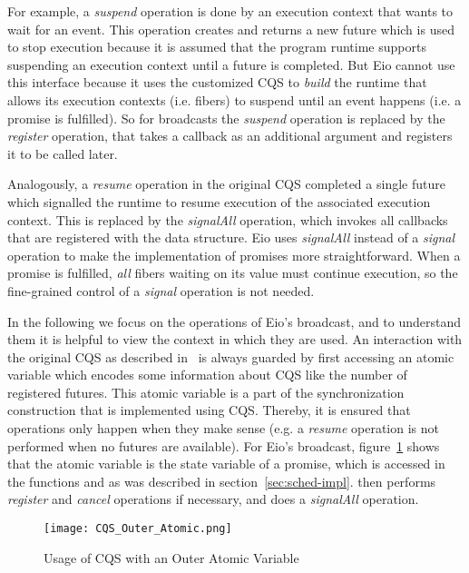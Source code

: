 For example, a \emph{suspend} operation is done by an execution context that wants to wait for an event.
This operation creates and returns a new future which is used to stop execution because it is assumed that the program runtime supports suspending an execution context until a future is completed.
But Eio cannot use this interface because it uses the customized CQS to \emph{build} the runtime that allows its execution contexts (i.e. fibers) to suspend until an event happens (i.e. a promise is fulfilled).
So for broadcasts the \emph{suspend} operation is replaced by the \emph{register} operation, that takes a callback as an additional argument and registers it to be called later.

Analogously, a \emph{resume} operation in the original CQS completed a single future which signalled the runtime to resume execution of the associated execution context.
This is replaced by the \emph{signalAll} operation, which invokes all callbacks that are registered with the data structure.
Eio uses \emph{signalAll} instead of a \emph{signal} operation to make the implementation of promises more straightforward.
When a promise is fulfilled, \emph{all} fibers waiting on its value must continue execution, so the fine-grained control of a \emph{signal} operation is not needed.


In the following we focus on the operations of Eio's broadcast, and to understand them it is helpful to view the context in which they are used.
An interaction with the original CQS as described in~\cite{koval2023cqs} is always guarded by first accessing an atomic variable which encodes some information about CQS like the number of registered futures.
This atomic variable is a part of the synchronization construction that is implemented using CQS.
Thereby, it is ensured that operations only happen when they make sense (e.g. a \emph{resume} operation is not performed when no futures are available).
For Eio's broadcast, figure~\ref{fig:cqs-usage} shows that the atomic variable is the state variable of a promise, which is accessed in the functions  and  as was described in section~\ref{sec:sched-impl}.
 then performs \emph{register} and \emph{cancel} operations if necessary, and  does a \emph{signalAll} operation.

\begin{figure}[ht]
  \texttt{[image: CQS\_Outer\_Atomic.png]}
  \caption{Usage of CQS with an Outer Atomic Variable}
  \label{fig:cqs-usage}
\end{figure}

